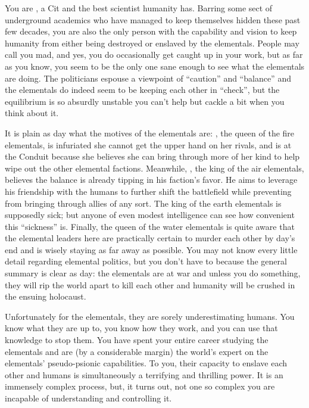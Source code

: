 \documentclass[char]{elementals}
\begin{document}
\name{\cMS{}}

You are \cMS{\intro}, a Cit and the best scientist humanity has. Barring some sect of underground academics who have managed to keep themselves hidden these past few decades, you are also the only person with the capability and vision to keep humanity from either being destroyed or enslaved by the elementals. People may call you mad, and yes, you do occasionally get caught up in your work, but as far as you know, you seem to be the only one sane enough to see what the elementals are doing. The politicians espouse a viewpoint of ``caution'' and ``balance'' and the elementals do indeed seem to be keeping each other in ``check'', but the equilibrium is so absurdly unstable you can't help but cackle a bit when you think about it.

It is plain as day what the motives of the elementals are: \cQueen{\intro}, the queen of the fire elementals, is infuriated she cannot get the upper hand on her rivals, and is at the Conduit because she believes she can bring through more of her kind to help wipe out the other elemental factions. Meanwhile, \cKing{\intro}, the king of the air elementals, believes the balance is already tipping in his faction's favor. He aims to leverage his friendship with the humans to further shift the battlefield while preventing \cQueen{} from bringing through allies of any sort. The king of the earth elementals is supposedly sick; but anyone of even modest intelligence can see how convenient this ``sickness'' is. Finally, the queen of the water elementals is quite aware that the elemental leaders here are practically certain to murder each other by day's end and is wisely staying as far away as possible. You may not know every little detail regarding elemental politics, but you don't have to because the general summary is clear as day: the elementals are at war and unless you do something, they will rip the world apart to kill each other and humanity will be crushed in the ensuing holocaust.

Unfortunately for the elementals, they are sorely underestimating humans. You know what they are up to, you know how they work, and you can use that knowledge to stop them. You have spent your entire career studying the elementals and are (by a considerable margin) the world's expert on the elementals' pseudo-psionic capabilities. To you, their capacity to enslave each other and humans is simultaneously a terrifying and thrilling power. It is an immensely complex process, but, it turns out, not one so complex you are incapable of understanding and controlling it. 
\end{document}
